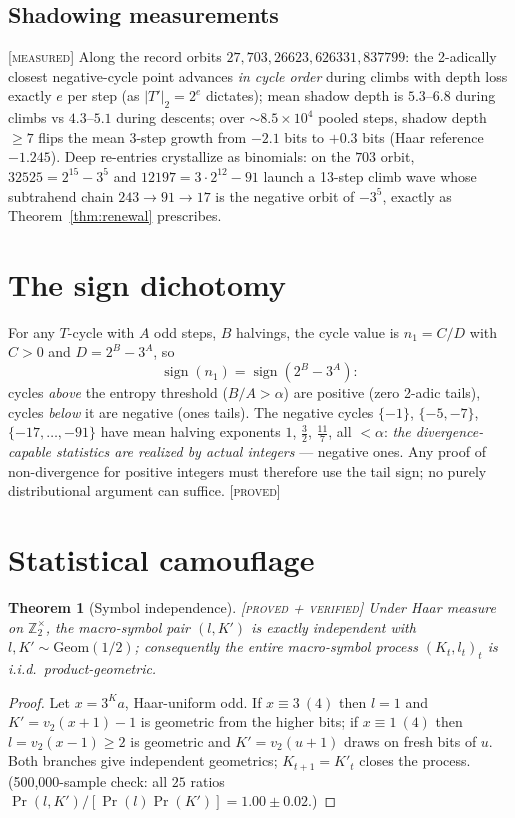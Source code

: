 \documentclass[11pt]{article}
\newtheorem{theorem}{Theorem}[section]
\theoremstyle{definition}
\newcommand{\PROVED}{\textup{[\textsc{proved}]}}
\newcommand{\PROVEDVER}{\textup{[\textsc{proved + verified}]}}
\newcommand{\MEASURED}{\textup{[\textsc{measured}]}}
\newcommand{\Z}{\mathbb{Z}}
\newcommand{\vv}{v_2}
\begin{document}
\subsection{Shadowing measurements} \MEASURED\;
Along the record orbits $27,703,26623,626331,837799$: the 2-adically closest
negative-cycle point advances \emph{in cycle order} during climbs with depth
loss exactly $e$ per step (as $|T'|_2=2^{e}$ dictates); mean shadow depth is
$5.3$--$6.8$ during climbs vs $4.3$--$5.1$ during descents; over $\sim
8.5\times 10^{4}$ pooled steps, shadow depth $\ge 7$ flips the mean 3-step
growth from $-2.1$ bits to $+0.3$ bits (Haar reference $-1.245$). Deep
re-entries crystallize as binomials: on the $703$ orbit,
$32525=2^{15}-3^{5}$ and $12197=3\cdot 2^{12}-91$ launch a 13-step climb wave
whose subtrahend chain $243\to 91\to 17$ is the negative orbit of $-3^{5}$,
exactly as Theorem~\ref{thm:renewal} prescribes.

\section{The sign dichotomy}\label{sec:sign}
For any $T$-cycle with $A$ odd steps, $B$ halvings, the cycle value is
$n_1=C/D$ with $C>0$ and $D=2^{B}-3^{A}$, so
\[
\operatorname{sign}(n_1)=\operatorname{sign}\!\left(2^{B}-3^{A}\right):
\]
cycles \emph{above} the entropy threshold ($B/A>\alpha$) are positive
(zero 2-adic tails), cycles \emph{below} it are negative (ones tails). The
negative cycles $\{-1\}$, $\{-5,-7\}$, $\{-17,\dots,-91\}$ have mean halving
exponents $1$, $\tfrac32$, $\tfrac{11}{7}$, all $<\alpha$: \emph{the
divergence-capable statistics are realized by actual integers} --- negative
ones. Any proof of non-divergence for positive integers must therefore use the
tail sign; no purely distributional argument can suffice. \PROVED

\section{Statistical camouflage}\label{sec:camo}

\begin{theorem}[Symbol independence]\label{thm:camo} \PROVEDVER\;
Under Haar measure on $\Z_2^{\times}$, the macro-symbol pair $(l,K')$ is
exactly independent with $l,K'\sim \mathrm{Geom}(1/2)$; consequently the entire
macro-symbol process $(K_t,l_t)_{t}$ is i.i.d.\ product-geometric.
\end{theorem}
\begin{proof}
Let $x=3^{K}a$, Haar-uniform odd. If $x\equiv 3\ (4)$ then $l=1$ and
$K'=\vv(x+1)-1$ is geometric from the higher bits; if $x\equiv 1\ (4)$ then
$l=\vv(x-1)\ge2$ is geometric and $K'=\vv(u+1)$ draws on fresh bits of $u$.
Both branches give independent geometrics; $K_{t+1}=K'_t$ closes the process.
(500{,}000-sample check: all $25$ ratios
$\Pr(l,K')/[\Pr(l)\Pr(K')]=1.00\pm0.02$.)
\end{proof}
\end{document}
